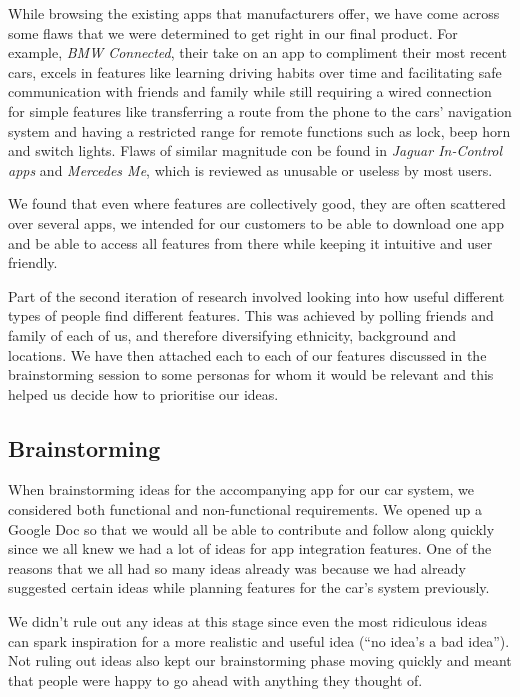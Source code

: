 \documentclass{article}
\begin{document}
While browsing the existing apps that manufacturers offer, we have come across some flaws that  we were determined to get right in our final product. For example, \textit{BMW Connected}, their take on an app to compliment their most recent cars, excels in features like learning driving habits over time and facilitating safe communication with friends and family while still requiring a wired connection for simple features like transferring a route from the phone to the cars' navigation system and having a restricted range for remote functions such as lock, beep horn and switch lights. Flaws of similar magnitude con be found in \textit{Jaguar In-Control apps} and \textit{Mercedes Me}, which is reviewed as unusable or useless by most users.

We found that even where features are collectively good, they are often scattered over several apps, we intended for our customers to be able to download one app and be able to access all features from there while keeping it intuitive and user friendly.

Part of the second iteration of research involved looking into how useful different types of people find different features. This was achieved by polling friends and family of each of us, and therefore diversifying ethnicity, background and locations. We have then attached each to each of our features discussed in the brainstorming session to some personas for whom it would be relevant and this helped us decide how to prioritise our ideas.

\subsection{Brainstorming}\label{ssec:app-brainstorming} %
When brainstorming ideas for the accompanying app for our car system, we considered both functional and non-functional requirements. We opened up a Google Doc so that we would all be able to contribute and follow along quickly since we all knew we had a lot of ideas for app integration features. One of the reasons that we all had so many ideas already was because we had already suggested certain ideas while planning features for the car's system previously.

We didn't rule out any ideas at this stage since even the most ridiculous ideas can spark inspiration for a more realistic and useful idea (``no idea's a bad idea''). Not ruling out ideas also kept our brainstorming phase moving quickly and meant that people were happy to go ahead with anything they thought of.
\end{document}
